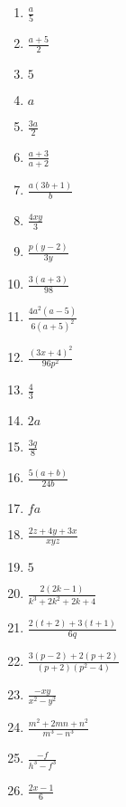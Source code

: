 {\begin{multicols}{3}
\begin{enumerate}[noitemsep, label=\textbf{\arabic*}. ] 
\item $\frac{a}{5}$%
\item $\frac{a + 5}{2}$%
\item $5$%
\item $a$%
\item $\frac{3a}{2}$%
\item $\frac{a + 3}{a + 2}$%
\item $\frac{a(3b + 1)}{b}$%
\item $\frac{4xy}{3}$%
\item $\frac{p(y - 2)}{3y}$%
\item $\frac{3(a + 3)}{98}$%
\item $\frac{4a^2(a - 5)}{6(a + 5)^2}$%
\item $\frac{(3x + 4)^2}{96p^2}$%
\item $\frac{4}{3}$%
\item $2a$%
\item $\frac{3q}{8}$%
\item $\frac{5(a + b)}{24b}$%
\item $fa$%
\item $\frac{2z + 4y + 3x}{xyz}$%
\item $5$%
\item $\frac{2(2k - 1)}{k^3 + 2k^2 + 2k + 4}$%
\item $\frac{2(t + 2) + 3(t + 1)}{6q}$%
\item $\frac{3(p - 2) + 2(p + 2)}{(p + 2)(p^2 - 4)}$%
\item $\frac{-xy}{x^2 - y^2}$%
\item $\frac{m^2 + 2mn + n^2}{m^3 - n^3}$%
\item $\frac{-f}{h^3 - f^3}$%
\item $\frac{2x - 1}{6}$%
\end{enumerate}



\end{multicols}}
